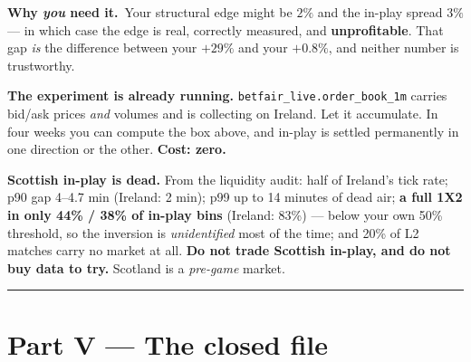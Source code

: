 \documentclass[11pt,a4paper]{article}
\newcommand{\whyyou}[1]{\smallskip\noindent\textbf{\small Why \emph{you} need it.}\ \small #1\normalsize}
\begin{document}
\whyyou{Your structural edge might be $2\%$ and the in-play spread $3\%$ --- in which case the edge is real,
correctly measured, and \textbf{unprofitable}. That gap \emph{is} the difference between your $+29\%$ and your
$+0.8\%$, and neither number is trustworthy.

\smallskip
\textbf{The experiment is already running.} \texttt{betfair\_live.order\_book\_1m} carries bid/ask prices
\emph{and} volumes and is collecting on Ireland. Let it accumulate. In four weeks you can compute the box
above, and in-play is settled permanently in one direction or the other. \textbf{Cost: zero.}}

\begin{closed}
\textbf{Scottish in-play is dead.} From the liquidity audit: half of Ireland's tick rate; p90 gap 4--4.7 min
(Ireland: 2 min); p99 up to 14 minutes of dead air; \textbf{a full 1X2 in only 44\% / 38\% of in-play bins}
(Ireland: 83\%) --- below your own 50\% threshold, so the inversion is \emph{unidentified} most of the time;
and 20\% of L2 matches carry no market at all. \textbf{Do not trade Scottish in-play, and do not buy data to
try.} Scotland is a \emph{pre-game} market.
\end{closed}

\bigskip\hrule\bigskip

\part*{Part V --- The closed file}
\end{document}
